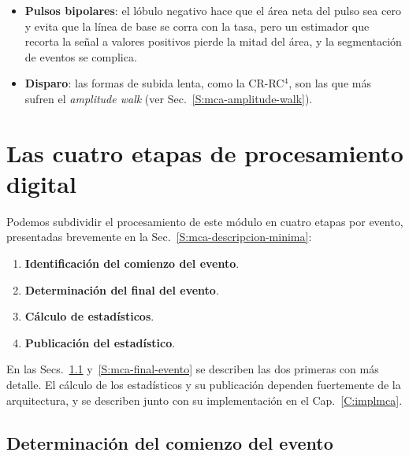 \begin{itemize}
    exponencial, y el conformado trapezoidal digital~\cite{Jordanov1994} la
    cancela cuando se conoce su constante de tiempo.
  \item \textbf{Pulsos bipolares}: el lóbulo negativo hace que el área neta del
    pulso sea cero y evita que la línea de base se corra con la tasa, pero un
    estimador que recorta la señal a valores positivos pierde la mitad del área,
    y la segmentación de eventos se complica.
  \item \textbf{Disparo}: las formas de subida lenta, como la CR-RC$^4$, son las
    que más sufren el \emph{amplitude walk} (ver
    Sec.~\ref{S:mca-amplitude-walk}).
\end{itemize}

\section{Las cuatro etapas de procesamiento digital}
\label{S:mca-etapas}

Podemos subdividir el procesamiento de este módulo en cuatro etapas por evento,
presentadas brevemente en la Sec.~\ref{S:mca-descripcion-minima}:
\begin{enumerate}
  \item \textbf{Identificación del comienzo del evento}.
  \item \textbf{Determinación del final del evento}.
  \item \textbf{Cálculo de estadísticos}.
  \item \textbf{Publicación del estadístico}.
\end{enumerate}

En las Secs.~\ref{S:mca-comienzo-evento} y~\ref{S:mca-final-evento} se describen las dos primeras con más detalle. El
cálculo de los estadísticos y su publicación dependen fuertemente de la
arquitectura, y se describen junto con su implementación en el
Cap.~\ref{C:implmca}.

\subsection{Determinación del comienzo del evento}
\label{S:mca-comienzo-evento}

